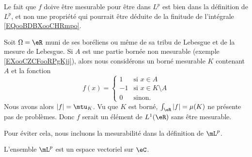 \begin{normaltext}
    Le fait que \( f\) doive être mesurable pour être dans \( L^p\) est bien dans la définition de \( L^p\), et non une propriété qui pourrait être déduite de la finitude de l'intégrale \eqref{EQooBDBXooCHRmpo}.

    Soit \( \Omega=\eR\) muni de ses boréliens ou même de sa tribu de Lebesgue et de la mesure de Lebesgue. Si \( A\) est une partie bornée non mesurable (exemple \ref{EXooCZCFooRPgKjj}), alors nous considérons un borné mesurable \( K\) contenant \( A\) et la fonction
    \begin{equation}
        f(x)=\begin{cases}
            1    &   \text{si } x\in A\\
            -1    &   \text{si } x\in K\setminus A\\
            0    &   \text{sinon. } 
        \end{cases}
    \end{equation}
    Nous avons alors \( | f |=\mtu_K\). Vu que \( K\) est borné, \( \int_{\eR}| f |=\mu(K)\) ne présente pas de problèmes. Donc \( f\) serait un élément de \( L^1(\eR)\) sans être mesurable.

    Pour éviter cela, nous incluons la mesurabilité dans la définition de \( \mL^p\). 
\end{normaltext}

\begin{lemma}       \label{LEMooHVZGooRwHXMk}
    L'ensemble \( \mL^p\) est un espace vectoriel sur \( \eC\).
\end{lemma}

